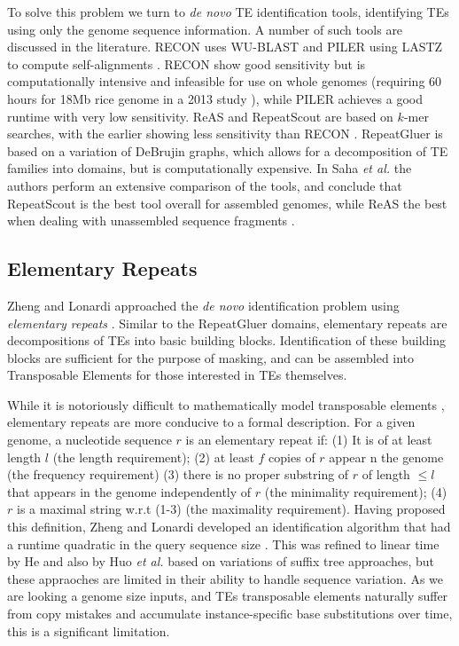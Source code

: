\documentclass[11pt,letterpaper]{amsart}
\begin{document}
To solve this problem we turn to {\it de novo} TE identification
tools, identifying TEs using only the genome sequence information.  A
number of such tools are discussed in the literature.  RECON uses
WU-BLAST and PILER using LASTZ to compute self-alignments
\cite{Bao:2002,Edgar:2005p2365,Lopez:2003td,Harris:2007uf}.  RECON
show good sensitivity but is computationally intensive and infeasible
for use on whole genomes (requiring 60 hours for 18Mb rice genome in a
2013 study \cite{Saha:2008dm}), while PILER achieves a good runtime with very low
sensitivity.  ReAS and RepeatScout \cite{Price:2005p1247} are based
on $k$-mer searches, with the earlier showing less sensitivity than
RECON \cite{Li:2005he, Price:2005p1247,Jiang:2013jt}.  RepeatGluer
\cite{Pevzner:2004p3157,Zhi:2006p3199} is based on a variation of
DeBrujin graphs, which allows for a decomposition of TE families into
domains, but is computationally expensive.  In Saha {\it et
  al.} the authors perform an extensive comparison of the tools, and
conclude that RepeatScout is the best tool overall for assembled
genomes, while ReAS the best when dealing with unassembled sequence
fragments \cite{Saha:2008dm}.


\subsection*{Elementary Repeats}
Zheng and Lonardi approached the {\it de novo} identification problem using {\it elementary repeats}
\cite{Zheng:2005bl}.
Similar to the RepeatGluer domains, elementary repeats are
decompositions of TEs into basic building blocks.  Identification of
these building blocks are sufficient for the purpose
of masking, and can be assembled into Transposable Elements for those
interested in TEs themselves.

While it is notoriously difficult to mathematically model transposable
elements \cite{Bao:2002}, elementary repeats are more conducive to a
formal description.  For a given genome, a nucleotide sequence $r$ is
an elementary repeat if: (1) It is of at least length $l$ (the length
requirement); (2) at least $f$ copies of $r$ appear  n the genome (the
frequency requirement) (3) there is no proper substring of $r$ of
length $\leq l$ that appears in the genome independently of $r$ (the
minimality requirement); (4) $r$ is a maximal string w.r.t (1-3) (the
maximality requirement).  Having proposed this definition, Zheng and
Lonardi developed an identification algorithm that had a runtime
quadratic in the query sequence size \cite{Zheng:2005bl}. This was
refined to linear time by He and also by Huo {\it et al.}
\cite{He:2006gpa,Huo:2009hoa} based on variations of suffix tree
approaches, but these appraoches are limited in their ability to handle sequence
variation.  As we are looking a genome size inputs, and TEs
transposable elements naturally suffer from copy mistakes and
accumulate instance-specific base substitutions over time, this is a
significant limitation.
\end{document}
